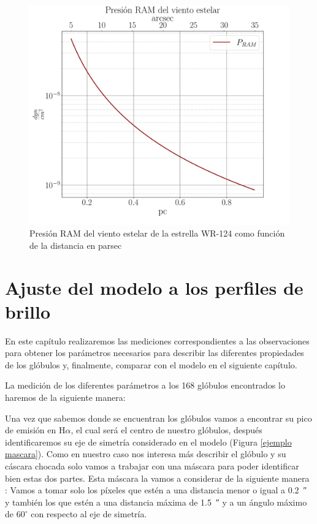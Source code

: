 \documentclass{book}
\begin{document}
\begin{figure}[htb]
    \centering    \includegraphics[width=\textwidth]{Nuevas imagenes finales/PRAMcgs.pdf}
    \caption{Presión RAM del viento estelar de la estrella WR-124 como función de la distancia en parsec}
    \label{P_RAM}
\end{figure}

\chapter{Ajuste del modelo a los perfiles de brillo}\label{Chapter : Ajuste}

En este capítulo realizaremos las mediciones correspondientes a las observaciones para obtener los parámetros necesarios para describir las diferentes propiedades de los glóbulos y, finalmente, comparar con el modelo en el siguiente capítulo.

La medición de los diferentes parámetros a los 168 glóbulos encontrados lo haremos de la siguiente manera:

Una vez que sabemos donde se encuentran los glóbulos vamos a encontrar su pico de emisión en H$\alpha$, el cual será el centro de nuestro glóbulos, después identificaremos su eje de simetría considerado en el modelo (Figura \ref{ejemplo mascara}). Como en nuestro caso nos interesa más describir el glóbulo y su cáscara chocada solo vamos a trabajar con una máscara para poder identificar bien estas dos partes. Esta máscara la vamos a considerar de la siguiente manera : Vamos a tomar solo los píxeles que estén a una distancia menor o igual a \SI{0.2}{\arcsecond} y también los que estén a una distancia máxima de \SI{1.5}{\arcsecond} y a un ángulo máximo de $60^\circ$ con respecto al eje de simetría. 
\end{document}
